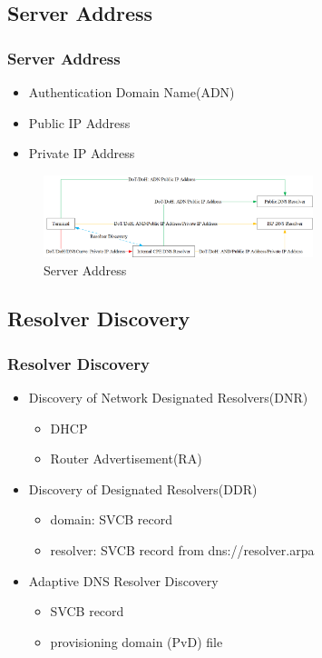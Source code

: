 \documentclass{ctexbeamer}
\begin{document}
\subsection{Server Address}
\begin{frame}
\frametitle{Server Address}

\begin{itemize}
    \item Authentication Domain Name(ADN)
    \item Public IP Address
    \item Private IP Address
\end{itemize}

    \begin{figure}[H]
        \centering 
        \includegraphics[width=0.7\textwidth]{pic/server_address.png} 
        \caption{Server Address} 
        \label{fig.server_address}
    \end{figure}

    \end{frame}

\subsection{Resolver Discovery}
\begin{frame}
\frametitle{Resolver Discovery}

\begin{itemize}
    \item Discovery of Network Designated Resolvers(DNR)
        \begin{itemize}
        \item DHCP 
        \item Router Advertisement(RA)
                \end{itemize}
    \item Discovery of Designated Resolvers(DDR)
        \begin{itemize}
        \item domain: SVCB record
        \item resolver: SVCB record from dns://resolver.arpa
            \end{itemize}
    \item Adaptive DNS Resolver Discovery
        \begin{itemize}
        \item SVCB record
        \item provisioning domain (PvD) file
                \end{itemize}
\end{itemize}
    \end{frame}
\end{document}
